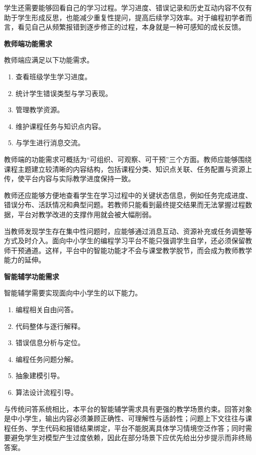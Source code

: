 学生还需要能够回看自己的学习过程。学习进度、错误记录和历史互动内容不仅有助于学生形成反思，也能减少重复性提问，提高后续学习效率。对于编程初学者而言，看见自己从频繁报错到逐步修正的过程，本身就是一种可感知的成长反馈。

\textbf{教师端功能需求}

教师端应满足以下功能需求。
\begin{enumerate}
  \item 查看班级学生学习进度。
  \item 统计学生错误类型与学习表现。
  \item 管理教学资源。
  \item 维护课程任务与知识点内容。
  \item 与学生进行消息交流。
\end{enumerate}

教师端的功能需求可概括为“可组织、可观察、可干预”三个方面。教师应能够围绕课程主题建立较清晰的内容结构，包括课程分类、知识点关联、任务配置与资源上传，使平台内容与实际教学进度保持一致。

教师还应能够方便地查看学生在学习过程中的关键状态信息，例如任务完成进度、错误分布、活跃情况和典型问题。若教师只能看到最终提交结果而无法掌握过程数据，平台对教学改进的支撑作用就会被大幅削弱。

当教师发现学生存在集中性问题时，应能够通过消息互动、资源补充或任务调整等方式及时介入。面向中小学生的编程学习平台不能只强调学生自学，还必须保留教师干预通道。这样，平台中的智能功能才不会与课堂教学脱节，而会成为教师教学能力的延伸。

\textbf{智能辅学功能需求}

智能辅学需要实现面向中小学生的以下能力。
\begin{enumerate}
  \item 编程相关自由问答。
  \item 代码整体与逐行解释。
  \item 错误信息分析与定位。
  \item 编程任务问题分解。
  \item 抽象建模引导。
  \item 算法设计流程引导。
\end{enumerate}

与传统问答系统相比，本平台的智能辅学需求具有更强的教学场景约束。回答对象是中小学生，输出内容必须兼顾正确性、可理解性与适龄性；问题上下文往往与课程任务、学生代码和报错结果绑定，平台不能脱离具体学习情境空泛作答；同时需要避免学生对模型产生过度依赖，因此在部分场景下应优先给出分步提示而非终局答案\cite{pirzado2024pitfalls,gonzalez2025k12gpt}。

